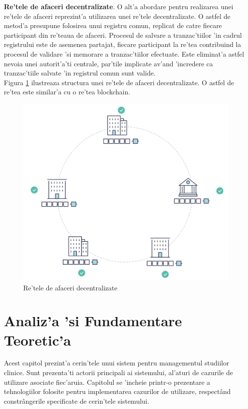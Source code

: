 \documentclass[12pt,a4paper,twoside]{report}
\begin{document}
\textbf{Re'tele de afaceri decentralizate}. O alt'a abordare pentru realizarea unei re'tele de afaceri reprezint'a utilizarea unei re'tele decentralizate. O astfel de metod'a presupune folosirea unui registru comun, replicat de catre fiecare participant din re'teaua de afaceri. Procesul de salvare a tranzac'tiilor 'in cadrul registrului este de asemenea partajat, fiecare participant la re'tea contribuind la procesul de validare 'si memorare a tranzac'tiilor efectuate. Este eliminat'a astfel nevoia unei autorit'a'ti centrale, par'tile implicate av'and 'incredere ca tranzac'tiile salvate 'in registrul comun sunt valide. \\
Figura \ref{fig:decentralised} ilustreaza structura unei re'tele de afaceri decentralizate. O astfel de re'tea este similar'a cu o re'tea blockchain.
		\begin{figure}[H]
		\begin{center}
			\includegraphics[scale=0.3]{img/future_net.png}
			\caption{Re'tele de afaceri decentralizate\cite{fabricdoc}}
  			\label{fig:decentralised}
  		\end{center}
  		\end{figure}
  		

\chapter{Analiz'a 'si Fundamentare Teoretic'a}
\label{ch:analysis}
Acest capitol prezint'a cerin'tele unui sistem pentru managementul studiilor clinice. Sunt prezenta'ti actorii principali ai sistemului, al'aturi de cazurile de utilizare asociate fiec'aruia. Capitolul se 'incheie printr-o prezentare a tehnologiilor folosite pentru implementarea cazurilor de utilizare, respect\^and constr\^angerile specificate de cerin'tele sistemului.
\end{document}
